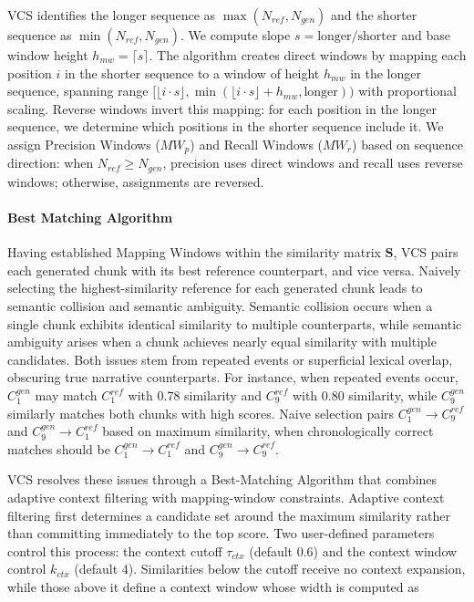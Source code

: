 \documentclass[letterpaper]{article} %
\begin{document}
VCS identifies the longer sequence as $\max(N_{ref}, N_{gen})$ and the shorter sequence as $\min(N_{ref}, N_{gen})$. We compute slope $s = \text{longer}/\text{shorter}$ and base window height $h_{mw} = \lceil s \rceil$. The algorithm creates direct windows by mapping each position $i$ in the shorter sequence to a window of height $h_{mw}$ in the longer sequence, spanning range $[\lfloor i \cdot s \rfloor, \min(\lfloor i \cdot s \rfloor + h_{mw}, \text{longer}))$ with proportional scaling. Reverse windows invert this mapping: for each position in the longer sequence, we determine which positions in the shorter sequence include it. We assign Precision Windows ($MW_p$) and Recall Windows ($MW_r$) based on sequence direction: when $N_{ref} \geq N_{gen}$, precision uses direct windows and recall uses reverse windows; otherwise, assignments are reversed.

\paragraph{Best Matching Algorithm}
Having established Mapping Windows within the similarity matrix $\mathbf{S}$, VCS pairs each generated chunk with its best reference counterpart, and vice versa. Naively selecting the highest-similarity reference for each generated chunk leads to semantic collision and semantic ambiguity. Semantic collision occurs when a single chunk exhibits identical similarity to multiple counterparts, while semantic ambiguity arises when a chunk achieves nearly equal similarity with multiple candidates. Both issues stem from repeated events or superficial lexical overlap, obscuring true narrative counterparts. For instance, when repeated events occur, $C_1^{gen}$ may match $C_1^{ref}$ with 0.78 similarity and $C_9^{ref}$ with 0.80 similarity, while $C_9^{gen}$ similarly matches both chunks with high scores. Naive selection pairs $C_1^{gen} \rightarrow C_9^{ref}$ and $C_9^{gen} \rightarrow C_1^{ref}$ based on maximum similarity, when chronologically correct matches should be $C_1^{gen} \rightarrow C_1^{ref}$ and $C_9^{gen} \rightarrow C_9^{ref}$.

VCS resolves these issues through a Best-Matching Algorithm that combines adaptive context filtering with mapping-window constraints. Adaptive context filtering first determines a candidate set around the maximum similarity rather than committing immediately to the top score. Two user-defined parameters control this process: the context cutoff $\tau_{ctx}$ (default 0.6) and the context window control $k_{ctx}$ (default 4). Similarities below the cutoff receive no context expansion, while those above it define a context window whose width is computed as
\end{document}
